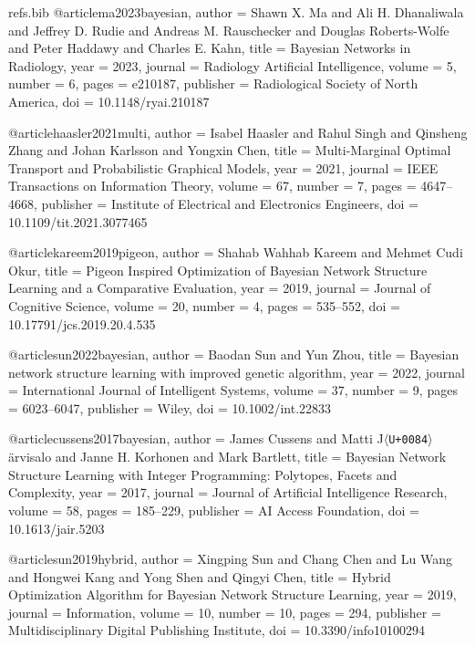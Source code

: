 \begin{filecontents*}[overwrite]{refs.bib}
@article{ma2023bayesian,
  author = {Shawn X. Ma and Ali H. Dhanaliwala and Jeffrey D. Rudie and Andreas M. Rauschecker and Douglas Roberts-Wolfe and Peter Haddawy and Charles E. Kahn},
  title = {{Bayesian Networks in Radiology}},
  year = {2023},
  journal = {Radiology Artificial Intelligence},
  volume = {5},
  number = {6},
  pages = {e210187},
  publisher = {Radiological Society of North America},
  doi = {10.1148/ryai.210187}
}

@article{haasler2021multi,
  author = {Isabel Haasler and Rahul Singh and Qinsheng Zhang and Johan Karlsson and Yongxin Chen},
  title = {{Multi-Marginal Optimal Transport and Probabilistic Graphical Models}},
  year = {2021},
  journal = {IEEE Transactions on Information Theory},
  volume = {67},
  number = {7},
  pages = {4647--4668},
  publisher = {Institute of Electrical and Electronics Engineers},
  doi = {10.1109/tit.2021.3077465}
}

@article{kareem2019pigeon,
  author = {Shahab Wahhab Kareem and Mehmet Cudi Okur},
  title = {{Pigeon Inspired Optimization of Bayesian Network Structure Learning and a Comparative Evaluation}},
  year = {2019},
  journal = {Journal of Cognitive Science},
  volume = {20},
  number = {4},
  pages = {535--552},
  doi = {10.17791/jcs.2019.20.4.535}
}

@article{sun2022bayesian,
  author = {Baodan Sun and Yun Zhou},
  title = {{Bayesian network structure learning with improved genetic algorithm}},
  year = {2022},
  journal = {International Journal of Intelligent Systems},
  volume = {37},
  number = {9},
  pages = {6023--6047},
  publisher = {Wiley},
  doi = {10.1002/int.22833}
}

@article{cussens2017bayesian,
  author = {James Cussens and Matti J\ensuremath{\langle}\texttt{U+0084}\ensuremath{\rangle}{\"a}rvisalo and Janne H. Korhonen and Mark Bartlett},
  title = {{Bayesian Network Structure Learning with Integer Programming: Polytopes, Facets and Complexity}},
  year = {2017},
  journal = {Journal of Artificial Intelligence Research},
  volume = {58},
  pages = {185--229},
  publisher = {AI Access Foundation},
  doi = {10.1613/jair.5203}
}

@article{sun2019hybrid,
  author = {Xingping Sun and Chang Chen and Lu Wang and Hongwei Kang and Yong Shen and Qingyi Chen},
  title = {{Hybrid Optimization Algorithm for Bayesian Network Structure Learning}},
  year = {2019},
  journal = {Information},
  volume = {10},
  number = {10},
  pages = {294},
  publisher = {Multidisciplinary Digital Publishing Institute},
  doi = {10.3390/info10100294}
}


\end{filecontents*}
